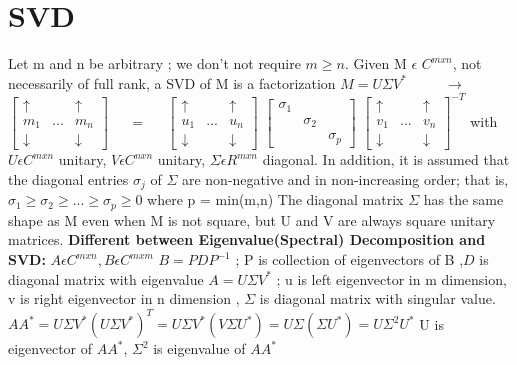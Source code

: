 \documentclass[]{finalproject}
\begin{document}
\clearpage


\section{SVD} \label{svd}
\begin{flushleft}
Let m and n be arbitrary ; we don’t not require $m \geqslant n$. Given M $\epsilon$ $C^{mxn}$, not necessarily of full rank, a SVD of M is a factorization \linebreak
$ M = U \Sigma V^{*} $ $\qquad$ $\longrightarrow$ $\qquad$
$\begin{bmatrix} 
\uparrow &  & \uparrow\\
m_{1} & ... & m_{n}\\
\downarrow & & \downarrow
\end{bmatrix}$
$\quad$ = $\quad$
$\begin{bmatrix} 
\uparrow &  & \uparrow\\
u_{1} & ... & u_{n}\\
\downarrow & & \downarrow
\end{bmatrix}$
$\begin{bmatrix}
\sigma_{1} &  & \\
 & \sigma_{2} & \\
 & & \sigma_{p}
\end{bmatrix}$
$\begin{bmatrix} 
\uparrow &  & \uparrow\\
v_{1} & ... & v_{n}\\
\downarrow & & \downarrow
\end{bmatrix} ^{-T}$
\newline \newline
with $U \epsilon C^{mxn}$ unitary, $V \epsilon C^{nxn}$ unitary, $\Sigma \epsilon R^{mxn}$ diagonal. \linebreak
In addition, it is assumed that the diagonal entries $\sigma_{j}$ of $\Sigma$ are non-negative and in non-increasing order; 
 that is, $\sigma_{1} \geqslant \sigma_{2} \geqslant . . .  \geqslant \sigma_{p} \geqslant 0$ where p = min(m,n) The diagonal matrix $\Sigma$ has the same shape as M even when M is not square, but U and V are always square unitary matrices. \cite{svd} \newline \newline
\textbf{Different between Eigenvalue(Spectral) Decomposition and SVD:}\newline
$ A \epsilon C^{mxn}, B \epsilon C^{mxm} $ \newline
$ B = P D P^{-1} $ ; P is collection of eigenvectors of B ,$ D $ is diagonal matrix with eigenvalue \newline
$ A = U \Sigma V^{*}$ ; u is left eigenvector in m dimension, v is right eigenvector in n dimension , $ \Sigma $ is diagonal matrix with singular value.\newline
 $AA^{*} = U\Sigma V^{*}(U \Sigma V^{*})^{T} = U\Sigma V^{*}(V \Sigma U^{*}) =  U\Sigma(\Sigma U^{*}) = U\Sigma^{2} U^{*}$ U is eigenvector of $AA^{*}$, $\Sigma^{2} $  is eigenvalue of $AA^{*}$ \newline \newline
 


\end{flushleft}
\end{document}
